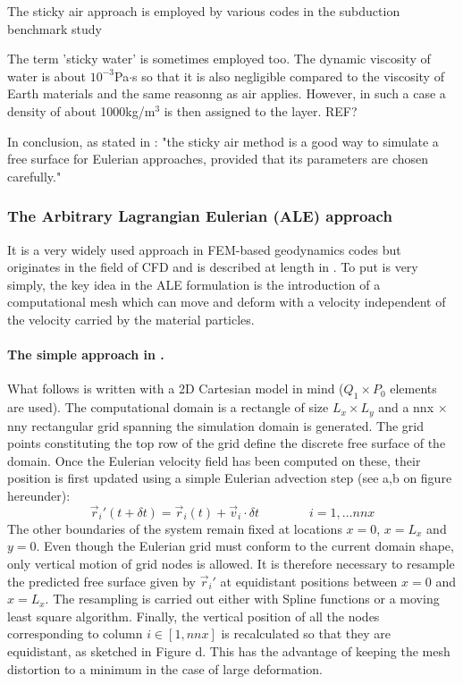 The sticky air approach is employed by various codes in the subduction benchmark study \cite{scbe08}

The term 'sticky water' is sometimes employed too. The dynamic viscosity of water is about 
$10^{-3}$Pa$\cdot$s so that it is also negligible compared to the viscosity of Earth materials
and the same reasonng as air applies. However, in such a case a density of about 1000kg/m$^3$ 
is then assigned to the layer. REF?

In conclusion, as stated in \cite{crsg12}: "the sticky air method is a good way to
simulate a free surface for Eulerian approaches, provided that its
parameters are chosen carefully."


\subsubsection{The Arbitrary Lagrangian Eulerian (ALE) approach}
 

It is a very widely used approach in FEM-based geodynamics codes but originates in the field of 
CFD \cite{hiac74,hulz81} and is described at length in \cite{sozo01,dohp04,dohu03}.
To put is very simply, the key idea in the ALE formulation is
the introduction of a computational mesh which can move and deform with a velocity 
independent of the velocity carried by the material particles.

\paragraph{The simple approach in \cite{thie11}.}
What follows is written with a 2D Cartesian model in mind ($Q_1\times P_0$ elements are used).
The computational domain is a rectangle of size $L_x \times  L_y$ 
and a nnx $\times$ nny rectangular grid spanning the simulation
domain is generated.
The grid points constituting the top row of the grid define the
discrete free surface of the domain. Once the Eulerian velocity field
has been computed on these, their position is first updated using a
simple Eulerian advection step (see a,b on figure hereunder):
\[
\vec{r}_i'(t+\delta t) = \vec{r}_i(t) + \vec{v}_i \cdot \delta t
\qquad\qquad
i=1,\dots nnx
\]
The other boundaries of the system remain fixed at locations
$x=0$, $x=L_x$ and $y=0$. Even though the Eulerian grid must conform
to the current domain shape, only vertical motion of grid nodes is
allowed. It is therefore necessary to resample the predicted free
surface given by $\vec{r}_i'$ at equidistant positions between $x=0$ and $x=L_x$.
The resampling is carried out either with Spline functions or a 
moving least square algorithm. 
Finally, the vertical position of all the nodes corresponding
to column $i\in [1,nnx]$ is recalculated so that they are equidistant, 
as sketched in Figure d. This has the advantage of keeping
the mesh distortion to a minimum in the case of large
deformation.


